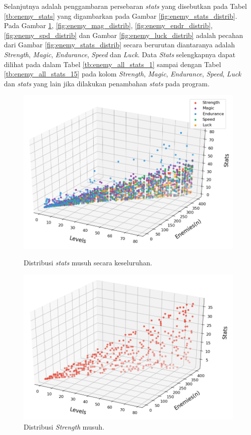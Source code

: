 Selanjutnya adalah penggambaran persebaran \textit{stats} yang disebutkan pada Tabel \ref{tb:enemy_stats} yang digambarkan pada Gambar \ref{fig:enemy_stats_distrib}. Pada Gambar \ref{fig:enemy_str_distrib}, \ref{fig:enemy_mag_distrib}, \ref{fig:enemy_endr_distrib}, \ref{fig:enemy_spd_distrib} dan Gambar \ref{fig:enemy_luck_distrib} adalah pecahan dari Gambar \ref{fig:enemy_stats_distrib} secara berurutan diantaranya adalah \textit{Strength}, \textit{Magic}, \textit{Endurance}, \textit{Speed} dan \textit{Luck}. Data \textit{Stats} selengkapnya dapat dilihat pada  dalam Tabel \ref{tb:enemy_all_stats_1} sampai dengan Tabel \ref{tb:enemy_all_stats_15} pada kolom \textit{Strength}, \textit{Magic}, \textit{Endurance}, \textit{Speed}, \textit{Luck} dan \textit{stats} yang lain jika dilakukan penambahan \textit{stats} pada program. 
\clearpage

\begin{figure} [!h] \centering
	\includegraphics[scale=0.6]{img/EnemyStatsDistrib.png}
	\caption{Distribusi \textit{stats} musuh secara keseluruhan.}
	\label{fig:enemy_stats_distrib}
	\vspace{5ex}

	\includegraphics[scale=0.6]{img/EnemyStrengthDistrib.png}
	\caption{Distribusi \textit{Strength} musuh.}
	\label{fig:enemy_str_distrib}
\end{figure}
\clearpage

